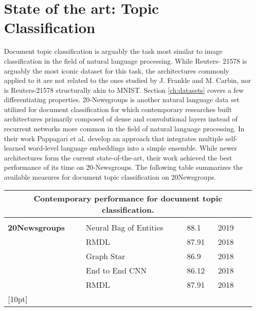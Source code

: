 
\section{State of the art: Topic Classification}
Document topic classification is arguably the task most similar to image classification in the field of natural language processing. While Reuters-
21578 is arguably the most iconic dataset for this task, the architectures commonly applied to it are not related to the ones studied by J. Frankle and M. Carbin, nor is Reuters-21578 structurally
akin to MNIST. Section \ref{ch:datasets} covers a few differentiating properties.
20-Newsgroups is another natural language data set utilized for document classification for which contemporary researches built architectures primarily composed of dense and convolutional layers instead of recurrent networks more common in the field of natural language processing. In their work Pappagari et al. develop an approach that integrates multiple self-learned word-level language embeddings into a simple ensemble.\cite{End-to-End-CNN}
While newer architectures form the current state-of-the-art, their work achieved the best performance of its time on 20-Newsgroups. The following table summarizes the available measures for document topic classification on 20Newsgroups.

\begin{tabularx}{\textwidth}{X X X X X}
	\multicolumn{5}{c}{\textbf{Contemporary performance for document topic classification.}}\\
	\hline
	\endhead
	\\
	\textbf{20Newsgroups} & Neural Bag of Entities & 88.1 & 2019 & \cite{Neural-BoE}\\
	& RMDL & 87.91 & 2018 & \cite{RMDL}\\
	& Graph Star & 86.9 & 2018 & \cite{Graph-Star}\\
	& End to End CNN & 86.12 & 2018 & \cite{End-to-End-CNN}\\
	& RMDL & 87.91 & 2018 & \cite{RMDL}\\
	[10pt]
	\hline
\end{tabularx}


